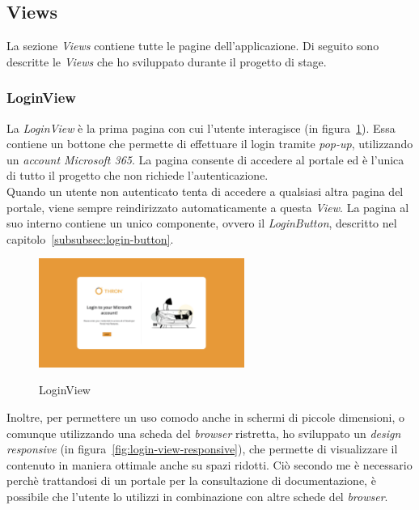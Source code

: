 \subsection{Views}\label{subsec:views}
La sezione \textit{Views} contiene tutte le pagine dell'applicazione.
Di seguito sono descritte le \textit{Views} che ho sviluppato durante il progetto di stage.

\subsubsection{LoginView}\label{subsubsec:login-view}
La \textit{LoginView} è la prima pagina con cui l'utente interagisce (in figura~\ref{fig:login-view}). Essa contiene un bottone che permette di effettuare il login tramite \textit{pop-up}, utilizzando un \textit{account Microsoft 365}.
La pagina consente di accedere al portale ed è l'unica di tutto il progetto che non richiede l'autenticazione.\\
Quando un utente non autenticato tenta di accedere a qualsiasi altra pagina del portale, viene sempre reindirizzato
automaticamente a questa \textit{View}. La pagina al suo interno contiene un unico componente, ovvero il \textit{LoginButton}, descritto nel capitolo~\ref{subsubsec:login-button}.
\begin{figure}[ht]
  \centering
  \includegraphics[width=0.6\textwidth, alt={Pagina di login dell'applicazione}]{images/frontend/LoginView.jpg}
  \caption{LoginView}\label{fig:login-view}
\end{figure}

Inoltre, per permettere un uso comodo anche in schermi di piccole dimensioni, o comunque utilizzando una scheda del \textit{browser} ristretta, ho sviluppato
un \textit{design responsive} (in figura~\ref{fig:login-view-responsive}), che permette di visualizzare il contenuto in maniera ottimale anche su spazi ridotti.
Ciò secondo me è necessario perchè trattandosi di un portale per la consultazione di documentazione, è possibile che l'utente 
lo utilizzi in combinazione con altre schede del \textit{browser}.

